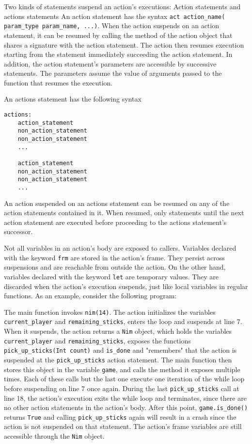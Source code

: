 Two kinds of statements suspend an action's executions: Action statements and actions statements
An action statement has the syntax \texttt{act action\_name( param\_type param\_name, ...)}.
When the action suspends on an action statement, it can be resumed by calling the method of the action object that shares a signature with the action statement.
The action then resumes execution starting from the statement immediately succeeding the action statement.
In addition, the action statement's parameters are accessible by successive statements.
The parameters assume the value of arguments passed to the function that resumes the execution.

An actions statement has the following syntax
\begin{lstlisting}
actions:
    action_statement
    non_action_statement
    non_action_statement
    ...

    action_statement
    non_action_statement
    non_action_statement
    ...
\end{lstlisting}
An action suspended on an actions statement can be resumed on any of the action statements contained in it.
When resumed, only statements until the next action statement are executed before proceeding to the actions statement's successor.


Not all variables in an action's body are exposed to callers.
Variables declared with the keyword \texttt{frm} are stored in the action's frame.
They persist across suspensions and are reachable from outside the action.
On the other hand, variables declared with the keyword \texttt{let} are temporary values.
They are discarded when the action's execution suspends, just like local variables in regular functions.
As an example, consider the following program:



The main function invokes \texttt{nim(14)}.
The action initializes the variables \texttt{current\_player} and \texttt{remaining\_sticks}, enters the loop and suspends at line 7.
When it suspends, the action returns a \texttt{Nim} object, which holds the variables
 \texttt{current\_player} and \texttt{remaining\_sticks}, exposes the functions \texttt{pick\_up\_sticks(Int count)} and \texttt{is\_done\(\)} 
 and "remembers" that the action is suspended at the \texttt{pick\_up\_sticks} action statement.
The main function then stores this object in the variable \texttt{game}, and calls the method it exposes multiple times.
Each of these calls but the last one execute one iteration of the while loop before suspending on line 7 once again.
During the last \texttt{pick\_up\_sticks} call at line 18, the action's execution exits the while loop and terminates, since there are no other action statements in the action's body.
After this point, \texttt{game.is\_done()} returns \texttt{True} and calling \texttt{pick\_up\_sticks} again will result in a crash since the action is not suspended on that statement.
The action's frame variables are still accessible through the \texttt{Nim} object.

